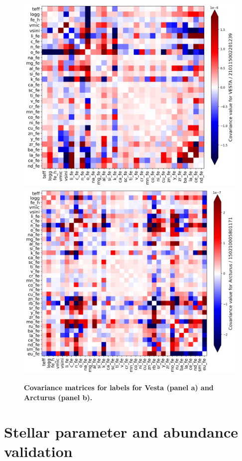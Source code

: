\documentclass[
  journal=pasa,
  manuscript=research-paper, %
  year=2024,
  volume=37
]{cup-journal}
\begin{document}
\begin{figure}[ht]
 \centering
 \includegraphics[width=\textwidth]{figures/covariance_vesta.png}
 \hfill
 \includegraphics[width=\textwidth]{figures/covariance_arcturus.png}
 \caption{\textbf{Covariance matrices for labels for Vesta (panel a) and Arcturus (panel b).}}
 \label{fig:covariance_vesta_arcturus}
\end{figure}

\section{Stellar parameter and abundance validation} \label{sec:stellar_param_abund_valid}
\end{document}
